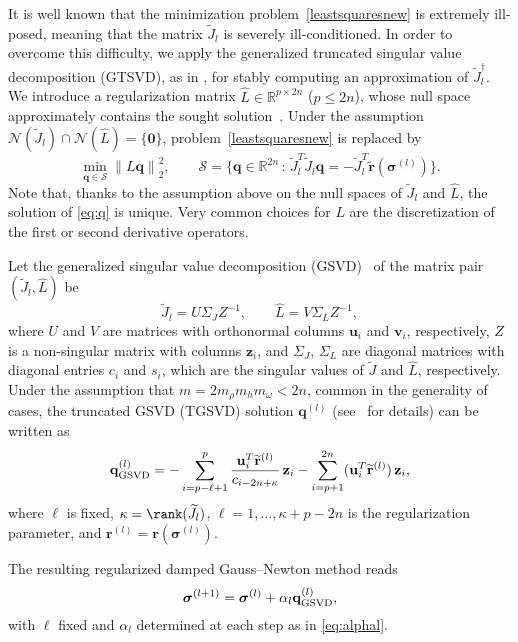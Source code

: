 \documentclass[final,leqno]{siamltex}
\newcommand{\R}{{\mathbb R}}
\newcommand{\norm}[1]{\left\| #1 \right\|}
\newcommand{\sigmab}{\boldsymbol{\sigma}}
\begin{document}
It is well known that the minimization problem~\eqref{leastsquaresnew} is
extremely ill-posed, meaning that the matrix $\widetilde{J}_l$ is severely ill-conditioned. In order to overcome this difficulty, we apply the generalized truncated singular value decomposition (GTSVD), as in \cite{dfr14,dr16,ddr17,ddrv19,ddflr20}, for stably computing an approximation of $\widetilde{J}_l^{\dagger}$. We introduce
a regularization matrix $\widehat{L}\in\R^{p\times 2n}$ ($p\leq 2n$), whose null space approximately contains the sought solution~\cite{rr13}. Under the assumption $\mathcal{N}(\widetilde{J}_l)\cap\mathcal{N}(\widehat{L})=\{\mathbf{0}\}$,
problem~\eqref{leastsquaresnew} is replaced by
\begin{equation}\label{eq:q}
\min_{\mathbf{q}\in\mathcal{S}} \norm{L\mathbf{q}}_2^2, \qquad
\mathcal{S} = \{ \mathbf{q}\in\R^{2n} \,:\, \widetilde{J}_l^T\widetilde{J}_l\mathbf{q}=-\widetilde{J}_l^T\widetilde{\mathbf{r}}(\sigmab^{(l)}) \}.
\end{equation}
Note that, thanks to the assumption above on the null spaces of $\widetilde{J}_l$ and $\widehat{L}$, the solution of \eqref{eq:q} is unique. Very common choices for $L$ are the discretization of the first or
second derivative operators.

Let the generalized singular value decomposition (GSVD)~\cite{gvl96} of the
matrix pair $(\widetilde{J}_l,\widehat{L})$ be
$$
\widetilde{J}_l = U \Sigma_J Z^{-1}, \qquad \widehat{L} = V \Sigma_L Z^{-1},
$$
where $U$ and $V$ are matrices with orthonormal columns $\mathbf{u}_i$ and $\mathbf{v}_i$, respectively, $Z$ is a non-singular matrix with columns $\mathbf{z}_i$, and $\Sigma_J$, $\Sigma_L$ are diagonal matrices with diagonal entries $c_i$ and $s_i$, which are the singular values of $\widetilde{J}$ and $\widehat{L}$, respectively.
Under the assumption that $m=2 m_\rho m_h m_\omega<2n$, common in the generality of cases, the truncated GSVD (TGSVD) solution $\mathbf{q}^{(l)}$ (see~\cite{Hansen} for details) can be written as 
\begin{equation}\label{eq:qGSVD}
\mathbf{q}^{(l)}_{\rm GSVD} = -\sum_{i=p-\ell+1}^p
    \frac{\mathbf{u}_i^T\widetilde{\mathbf{r}}^{(l)}}{c_{i-2n+\kappa}}\, \mathbf{z}_i
    - \sum_{i=p+1}^{2n} (\mathbf{u}_i^T\widetilde{\mathbf{r}}^{(l)})\, \mathbf{z}_i,
\end{equation}
where $\ell$ is fixed, $\kappa=\rank(\widetilde{J}_l)$, $\ell=1,\ldots,\kappa+p-2n$
is the regularization parameter, and $\mathbf{r}^{(l)}=\mathbf{r}(\sigmab^{(l)})$.

The resulting regularized damped Gauss--Newton method reads
$$
\sigmab^{(l+1)} =
\sigmab^{(l)} + \alpha_l \mathbf{q}^{(l)}_{\rm GSVD},
$$
with $\ell$ fixed and $\alpha_l$ determined at each step as in \eqref{eq:alphal}.
\end{document}
